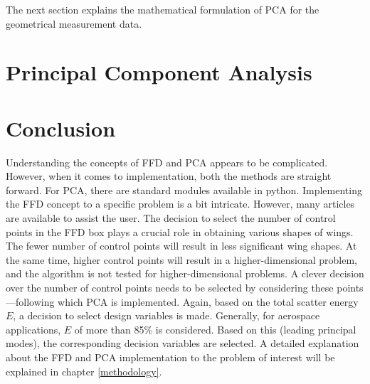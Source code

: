The next section explains the mathematical formulation of PCA for the geometrical measurement data.

\section{Principal Component Analysis}


\section{Conclusion}
Understanding the concepts of FFD and PCA appears to be complicated. However, when it comes to implementation, both the methods are straight forward. For PCA, there are standard modules available in python. Implementing the FFD concept to a specific problem is a bit intricate. However, many articles are available to assist the user. The decision to select the number of control points in the FFD box plays a crucial role in obtaining various shapes of wings. The fewer number of control points will result in less significant wing shapes. At the same time, higher control points will result in a higher-dimensional problem, and the algorithm is not tested for higher-dimensional problems. A clever decision over the number of control points needs to be selected by considering these points—following which PCA is implemented. Again, based on the total scatter energy $ E $, a decision to select design variables is made. Generally, for aerospace applications, $E$ of more than 85\% is considered. Based on this (leading principal modes), the corresponding decision variables are selected. A detailed explanation about the FFD and PCA implementation to the problem of interest will be explained in chapter \ref{methodology}.